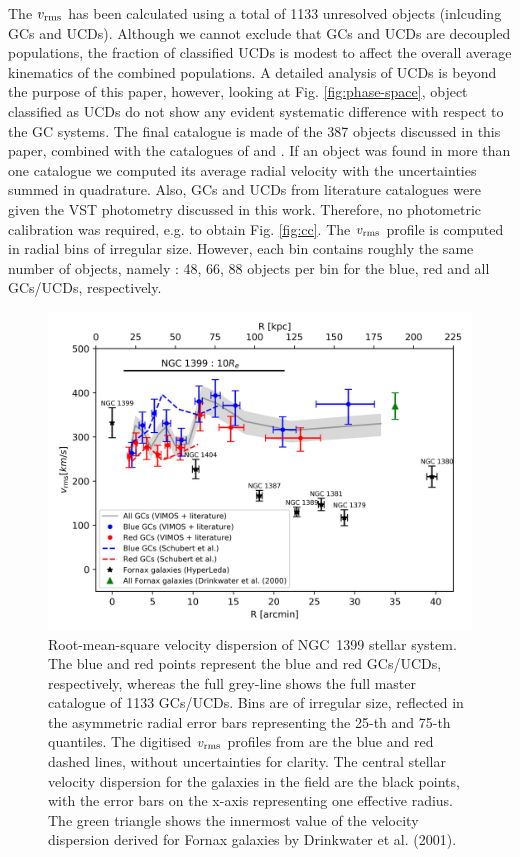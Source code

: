 \documentclass[useAMS,usenatbib]{mn2e}
\begin{document}
The $v_{\rm rms}$ has been calculated using a total of 1133 unresolved objects 
(inlcuding GCs and UCDs). Although we cannot exclude that GCs and UCDs are 
decoupled populations, 
the fraction of classified UCDs is modest to affect the overall average 
kinematics of the combined populations. A detailed analysis of UCDs is beyond 
the purpose of this paper,
however, looking at Fig. \ref{fig:phase-space}, object classified as UCDs do 
not show any evident systematic difference with respect to the GC systems. 
The final catalogue is made of the 387 objects discussed in this paper, 
combined with the catalogues of \citet{Bergond07} and \citet{Schuberth}. If an 
object was found in more than one catalogue we computed its average radial 
velocity with the uncertainties summed in quadrature. Also, GCs and UCDs from 
literature catalogues were given the VST photometry discussed in this work. 
Therefore, no photometric calibration was required, e.g. to obtain Fig. 
\ref{fig:cc}. The $v_{\rm rms}$ profile is computed in radial bins of irregular 
size. However, each bin contains roughly the same number of objects, namely : 
48, 66, 88 objects per bin for the blue, red and all GCs/UCDs, respectively. 

\begin{figure}
\centering
\includegraphics[scale = 1]{figures/vrms.png} 
\caption{Root-mean-square velocity dispersion of NGC~1399 stellar system. The 
blue and red points represent the blue and red GCs/UCDs, respectively, whereas 
the full grey-line shows the full master catalogue of 1133 GCs/UCDs. Bins are 
of irregular size, reflected in the asymmetric radial error bars representing 
the 25-th and 75-th quantiles. The digitised $v_{\rm rms}$ profiles from 
\citet{Schuberth} are the blue and red dashed lines, without uncertainties for 
clarity. The central stellar velocity dispersion for the galaxies in the field 
are the black points, with the error bars on the x-axis representing one 
effective radius. The green triangle shows the innermost value of the velocity 
dispersion derived for Fornax galaxies by Drinkwater et al. (2001).}
\label{fig:vrms}
\end{figure}
\end{document}

